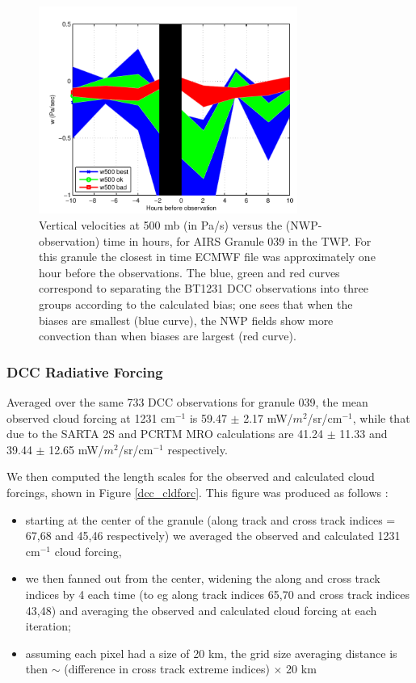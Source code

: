 \documentclass[agupp]{aguplus}              %
\newcommand{\wn}{cm$^{-1}$\xspace}
\begin{document}
\begin{article}
\begin{figure}[h]
\noindent\includegraphics[width=20pc]{FIGS/dcc_day_twp_obs_w500_manyspotsG039}
\caption{Vertical velocities at 500 mb (in Pa/s) versus the (NWP-observation) time in hours, for AIRS Granule 
039 in the TWP.  For this granule the closest in time ECMWF file was
approximately one hour before the observations. The blue, green and
red curves correspond to separating the BT1231 DCC observations into
three groups according to the calculated bias; one sees that when the
biases are smallest (blue curve), the NWP fields show more convection
than when biases are largest (red curve).}
\label{dcc_day_twp_obs_w500_manyspotsG039} 
\end{figure}

\subsubsection{DCC Radiative Forcing}

Averaged over the same 733 DCC observations for granule 039,
the mean observed cloud forcing at 1231 \wn is 59.47 $\pm$ 2.17
mW/$m^2$/sr/\wn, while that due to the SARTA 2S and PCRTM MRO
calculations are 41.24 $\pm$ 11.33 and 39.44 $\pm$ 12.65 mW/$m^2$/sr/\wn
respectively.

We then computed the length scales for the observed and calculated cloud 
forcings, shown in Figure \ref{dcc_cldforc}. This figure was produced as follows : 
\begin{itemize}
  \item starting at the center of the  granule (along track and cross track indices = 67,68 and
        45,46 respectively) we averaged the observed and calculated 1231 \wn cloud forcing,
  \item we then fanned out from the center, widening the along and cross track indices by 4 each time 
        (to eg along track indices 65,70 and cross track indices 43,48) and averaging the
        observed and calculated cloud forcing at each iteration;
  \item assuming each pixel had a size of 20 km, the grid size averaging distance is then $\sim$ (difference 
        in cross track extreme indices) $\times$ 20 km
\end{itemize}


\end{article}
\end{document}
